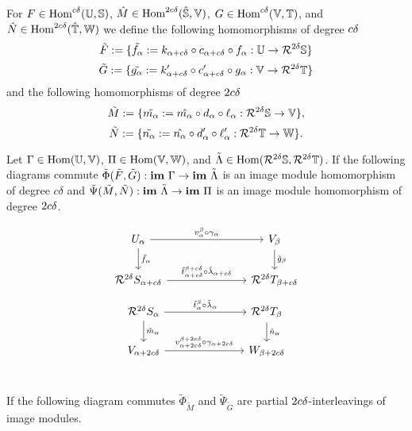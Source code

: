 For $F\in\text{Hom}^{c\delta}(\mathbb{U},\mathbb{S})$, $\hat{M}\in\text{Hom}^{2c\delta}(\hat{\mathbb{S}},\mathbb{V})$, $G\in\text{Hom}^{c\delta}(\mathbb{V},\mathbb{T})$, and $\hat{N}\in\text{Hom}^{2c\delta}(\hat{\mathbb{T}},\mathbb{W})$ we define the following homomorphisms of degree $c{\delta}$
\[ \tilde{F} := \{\tilde{f_\alpha}:= k_{\alpha+c{\delta}}\circ c_{\alpha+c{\delta}}\circ f_\alpha : \mathbb{U}\to\mathcal{R}^{2{\delta}}\mathbb{S}\}\]
\[ \tilde{G} := \{\tilde{g_\alpha}:= k_{\alpha+c{\delta}}'\circ c_{\alpha+c{\delta}}'\circ g_\alpha : \mathbb{V}\to\mathcal{R}^{2{\delta}}\mathbb{T}\}\]
and the following homomorphisms of degree $2c{\delta}$
\[ \tilde{M} := \{\tilde{m_\alpha}:= \hat{m_\alpha}\circ d_\alpha\circ \ell_\alpha :\mathcal{R}^{2{\delta}}\mathbb{S}\to\mathbb{V}\},\]
\[ \tilde{N} := \{\tilde{n_\alpha}:=\hat{n_\alpha}\circ d_\alpha'\circ\ell_\alpha' : \mathcal{R}^{2{\delta}}\mathbb{T}\to\mathbb{W}\}.\]

Let $\Gamma\in\text{Hom}(\mathbb{U}, \mathbb{V})$, $\Pi\in\text{Hom}(\mathbb{V},\mathbb{W})$, and $\tilde{\Lambda}\in\text{Hom}(\mathcal{R}^{2{\delta}}\mathbb{S},\mathcal{R}^{2{\delta}}\mathbb{T})$.
If the following diagrams commute $\tilde{\Phi}(\tilde{F},\tilde{G}) : \mathbf{im}~\Gamma\to\mathbf{im}~\tilde{\Lambda}$ is an image module homomorphism of degree $c\delta$ and $\tilde{\Psi}(\tilde{M},\tilde{N}) : \mathbf{im}~\tilde{\Lambda}\to \mathbf{im}~\Pi$ is an image module homomorphism of degree $2c{\delta}$.

\begin{equation}\label{dgm:shifted_homomorphism_rips1}
  \begin{tikzcd}[column sep=large]
    U_\alpha\arrow{rr}{v_\alpha^\beta\circ\gamma_\alpha}\arrow{d}{\tilde{f}_\alpha} &&
    V_\beta\arrow{d}{\tilde{g}_\beta}\\
    \rips^{2\of} S_{\alpha+c\delta}\arrow{rr}{\tilde{t}_{\alpha+c\delta}^{\beta+c\delta}\circ\tilde{\lambda}_{\alpha+c\delta}} &&
    \rips^{2\of} T_{\beta +c\delta}
\end{tikzcd}\end{equation}
\begin{equation}\label{dgm:shifted_homomorphism_rips2}
  \begin{tikzcd}[column sep=large]
    \rips^{2\of} S_{\alpha}\arrow{rr}{\tilde{t}_{\alpha}^{\beta}\circ\tilde{\lambda}_{\alpha}}\arrow{d}{\tilde{m}_\alpha} & &
    \rips^{2\of} T_{\beta}\arrow{d}{\tilde{n}_\alpha}\\
    V_{\alpha+2c\of}\arrow{rr}{v_{\alpha+2c\delta}^{\beta+2c\delta}\circ\gamma_{\alpha+2c\delta}} &&
    W_{\beta+2c\of}\\
\end{tikzcd}\end{equation}

If the following diagram commutes $\tilde{\Phi}_{\tilde{M}}$ and $\tilde{\Psi}_{\tilde{G}}$ are partial $2c{\delta}$-interleavings of image modules.

